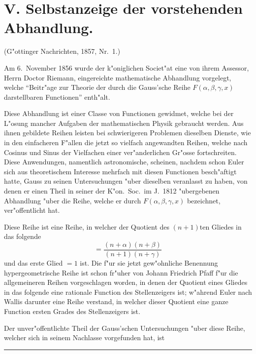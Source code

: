 \documentclass[12pt,a4paper]{book}
\theoremstyle{definition}
\theoremstyle{remark}
\begin{document}
\section*{V. Selbstanzeige der vorstehenden Abhandlung.}

\begin{center}
\small
(G{"o}ttinger Nachrichten, 1857, Nr.~1.)
\end{center}
\vspace{0.5em}

Am 6.~November 1856 wurde der k{"o}niglichen Societ{"a}t eine von ihrem Assessor, Herrn Doctor Riemann, eingereichte mathematische Abhandlung vorgelegt, welche ``Beitr{"a}ge zur Theorie der durch die Gauss'sche Reihe $F(\alpha, \beta, \gamma, x)$ darstellbaren Functionen'' enth{"a}lt.

Diese Abhandlung ist einer Classe von Functionen gewidmet, welche bei der L{"o}sung mancher Aufgaben der mathematischen Physik gebraucht werden. Aus ihnen gebildete Reihen leisten bei schwierigeren Problemen dieselben Dienste, wie in den einfacheren F{"a}llen die jetzt so vielfach angewandten Reihen, welche nach Cosinus und Sinus der Vielfachen einer ver{"a}nderlichen Gr{"o}sse fortschreiten. Diese Anwendungen, namentlich astronomische, scheinen, nachdem schon Euler sich aus theoretischem Interesse mehrfach mit diesen Functionen besch{"a}ftigt hatte, Gauss zu seinen Untersuchungen {"u}ber dieselben veranlasst zu haben, von denen er einen Theil in seiner der K{"o}n.\ Soc.\ im J.\ 1812 {"u}bergebenen Abhandlung {"u}ber die Reihe, welche er durch $F(\alpha, \beta, \gamma, x)$ bezeichnet, ver{"o}ffentlicht hat.

Diese Reihe ist eine Reihe, in welcher der Quotient des $(n + 1)$ten Gliedes in das folgende
\[
= \frac{(n + \alpha)(n + \beta)}{(n + 1)(n + \gamma)}
\]
und das erste Glied $= 1$ ist. Die f{"u}r sie jetzt gew{"o}hnliche Benennung hypergeometrische Reihe ist schon fr{"u}her von Johann Friedrich Pfaff f{"u}r die allgemeineren Reihen vorgeschlagen worden, in denen der Quotient eines Gliedes in das folgende eine rationale Function des Stellenzeigers ist; w{"a}hrend Euler nach Wallis darunter eine Reihe verstand, in welcher dieser Quotient eine ganze Function ersten Grades des Stellenzeigers ist.

Der unver{"o}ffentlichte Theil der Gauss'schen Untersuchungen {"u}ber diese Reihe, welcher sich in seinem Nachlasse vorgefunden hat, ist 

\vspace{2em}
\begin{center}
\rule{0.5\textwidth}{0.4pt}
\end{center}
\end{document}
